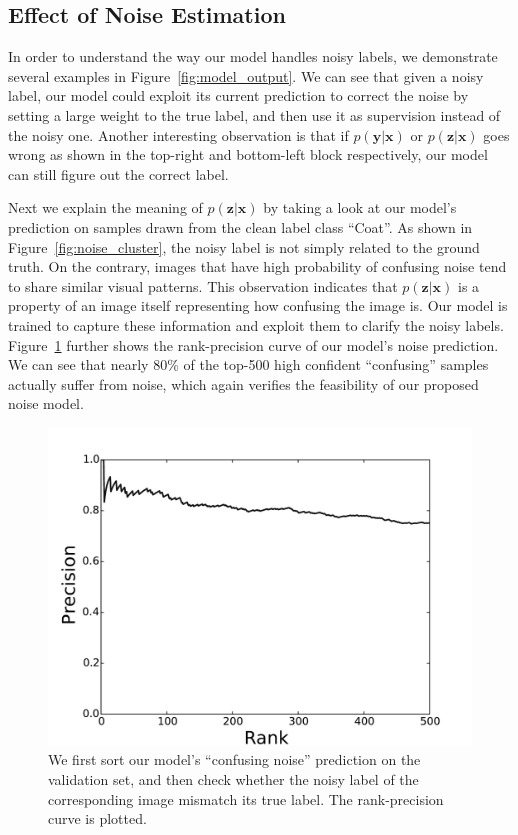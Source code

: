 \documentclass[10pt,twocolumn,letterpaper]{article}
\def\vec{\mathbf}
\begin{document}
\subsection{Effect of Noise Estimation} %
\label{sub:effect_of_noise_estimation}
In order to understand the way our model handles noisy labels, we demonstrate several examples in Figure~\ref{fig:model_output}. We can see that given a noisy label, our model could exploit its current prediction to correct the noise by setting a large weight to the true label, and then use it as supervision instead of the noisy one. Another interesting observation is that if $p(\vec{y}|\vec{x})$ or $p(\vec{z}|\vec{x})$ goes wrong as shown in the top-right and bottom-left block respectively, our model can still figure out the correct label.

Next we explain the meaning of $p(\vec{z}|\vec{x})$ by taking a look at our model's prediction on samples drawn from the clean label class ``Coat''. As shown in Figure~\ref{fig:noise_cluster}, the noisy label is not simply related to the ground truth. On the contrary, images that have high probability of confusing noise tend to share similar visual patterns. This observation indicates that $p(\vec{z}|\vec{x})$ is a property of an image itself representing how confusing the image is. Our model is trained to capture these information and exploit them to clarify the noisy labels. Figure~\ref{fig:noise_prediction_rp} further shows the rank-precision curve of our model's noise prediction. We can see that nearly $80\%$ of the top-500 high confident ``confusing'' samples actually suffer from noise, which again verifies the feasibility of our proposed noise model.

\begin{figure}[t]
\begin{center}
\includegraphics[width=0.8\linewidth]{figure/noise_prediction_rank_precision.pdf}
\end{center}
\caption{We first sort our model's ``confusing noise'' prediction on the validation set, and then check whether the noisy label of the corresponding image mismatch its true label. The rank-precision curve is plotted.}
\label{fig:noise_prediction_rp}
\end{figure}
\end{document}
